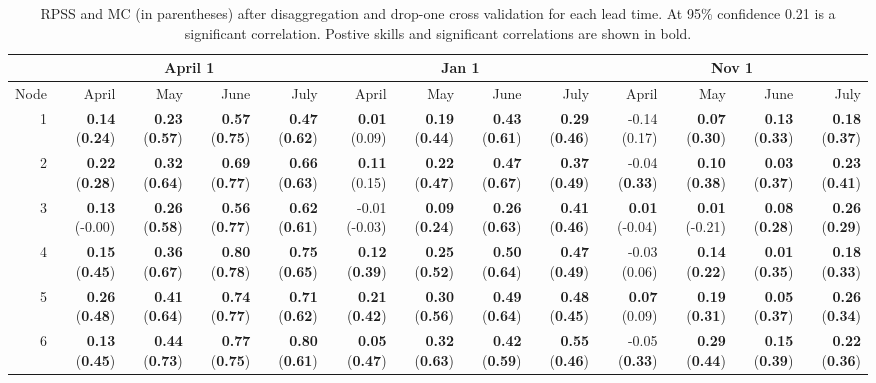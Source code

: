 \begin{sidewaystable}[ht]
\begin{center}\footnotesize
\caption{RPSS and MC (in parentheses) after disaggregation and drop-one cross validation for each lead time. At 95\% confidence 0.21 is a significant correlation. Postive skills and significant correlations are shown in bold.}\label{tab:dropone}
\begin{tabular}{rrrrr|rrrr|rrrr}
  \toprule
  &\multicolumn{4}{c}{April 1} & \multicolumn{4}{c}{Jan 1} & \multicolumn{4}{c}{Nov 1}\\
  \midrule
Node & April & May & June & July & April & May & June & July & April & May & June & July \\ 
  \midrule
  1 & {\bf 0.14} ({\bf 0.24}) & {\bf 0.23} ({\bf 0.57}) & {\bf 0.57} ({\bf 0.75}) & {\bf 0.47} ({\bf 0.62}) & {\bf 0.01} (0.09) & {\bf 0.19} ({\bf 0.44}) & {\bf 0.43} ({\bf 0.61}) & {\bf 0.29} ({\bf 0.46}) & -0.14 (0.17) & {\bf 0.07} ({\bf 0.30}) & {\bf 0.13} ({\bf 0.33}) & {\bf 0.18} ({\bf 0.37}) \\ 
    2 & {\bf 0.22} ({\bf 0.28}) & {\bf 0.32} ({\bf 0.64}) & {\bf 0.69} ({\bf 0.77}) & {\bf 0.66} ({\bf 0.63}) & {\bf 0.11} (0.15) & {\bf 0.22} ({\bf 0.47}) & {\bf 0.47} ({\bf 0.67}) & {\bf 0.37} ({\bf 0.49}) & -0.04 ({\bf 0.33}) & {\bf 0.10} ({\bf 0.38}) & {\bf 0.03} ({\bf 0.37}) & {\bf 0.23} ({\bf 0.41}) \\ 
    3 & {\bf 0.13} (-0.00) & {\bf 0.26} ({\bf 0.58}) & {\bf 0.56} ({\bf 0.77}) & {\bf 0.62} ({\bf 0.61}) & -0.01 (-0.03) & {\bf 0.09} ({\bf 0.24}) & {\bf 0.26} ({\bf 0.63}) & {\bf 0.41} ({\bf 0.46}) & {\bf 0.01} (-0.04) & {\bf 0.01} (-0.21) & {\bf 0.08} ({\bf 0.28}) & {\bf 0.26} ({\bf 0.29}) \\ 
    4 & {\bf 0.15} ({\bf 0.45}) & {\bf 0.36} ({\bf 0.67}) & {\bf 0.80} ({\bf 0.78}) & {\bf 0.75} ({\bf 0.65}) & {\bf 0.12} ({\bf 0.39}) & {\bf 0.25} ({\bf 0.52}) & {\bf 0.50} ({\bf 0.64}) & {\bf 0.47} ({\bf 0.49}) & -0.03 (0.06) & {\bf 0.14} ({\bf 0.22}) & {\bf 0.01} ({\bf 0.35}) & {\bf 0.18} ({\bf 0.33}) \\ 
    5 & {\bf 0.26} ({\bf 0.48}) & {\bf 0.41} ({\bf 0.64}) & {\bf 0.74} ({\bf 0.77}) & {\bf 0.71} ({\bf 0.62}) & {\bf 0.21} ({\bf 0.42}) & {\bf 0.30} ({\bf 0.56}) & {\bf 0.49} ({\bf 0.64}) & {\bf 0.48} ({\bf 0.45}) & {\bf 0.07} (0.09) & {\bf 0.19} ({\bf 0.31}) & {\bf 0.05} ({\bf 0.37}) & {\bf 0.26} ({\bf 0.34}) \\ 
    6 & {\bf 0.13} ({\bf 0.45}) & {\bf 0.44} ({\bf 0.73}) & {\bf 0.77} ({\bf 0.75}) & {\bf 0.80} ({\bf 0.61}) & {\bf 0.05} ({\bf 0.47}) & {\bf 0.32} ({\bf 0.63}) & {\bf 0.42} ({\bf 0.59}) & {\bf 0.55} ({\bf 0.46}) & -0.05 ({\bf 0.33}) & {\bf 0.29} ({\bf 0.44}) & {\bf 0.15} ({\bf 0.39}) & {\bf 0.22} ({\bf 0.36}) \\ 

\end{tabular}
\end{center}
\end{sidewaystable}
